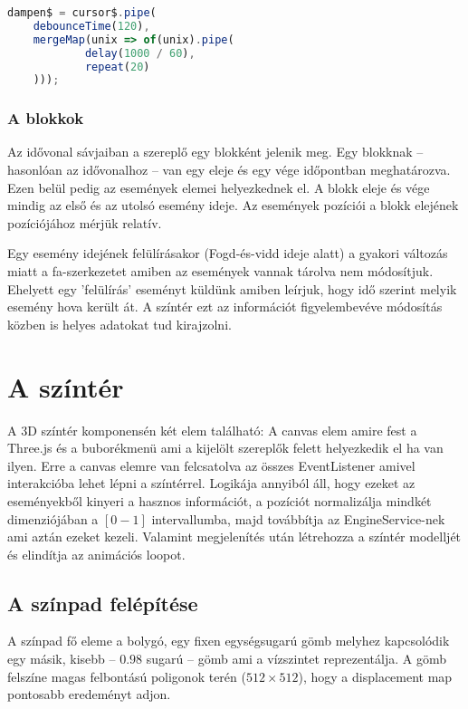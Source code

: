 \begin{lstlisting}[language={JavaScript}]
dampen$ = cursor$.pipe(
	debounceTime(120),
	mergeMap(unix => of(unix).pipe(
			delay(1000 / 60),
			repeat(20)
	)));
\end{lstlisting}

\subsubsection{A blokkok}

Az idővonal sávjaiban a szereplő egy blokként jelenik meg. Egy blokknak -- hasonlóan az idővonalhoz -- van egy eleje és egy vége időpontban meghatározva. Ezen belül pedig az események elemei helyezkednek el. A blokk eleje és vége mindig az első és az utolsó esemény ideje. Az események pozíciói a blokk elejének pozíciójához mérjük relatív.

Egy esemény idejének felülírásakor (Fogd-és-vidd ideje alatt) a gyakori változás miatt a fa-szerkezetet amiben az események vannak tárolva nem módosítjuk. Ehelyett egy 'felülírás' eseményt küldünk amiben leírjuk, hogy idő szerint melyik esemény hova került át. A színtér ezt az információt figyelembevéve módosítás közben is helyes adatokat tud kirajzolni.

\section{A színtér}

A 3D színtér komponensén két elem található: A canvas elem amire fest a Three.js és a buborékmenü ami a kijelölt szereplők felett helyezkedik el ha van ilyen. Erre a canvas elemre van felcsatolva az összes EventListener amivel interakcióba lehet lépni a színtérrel. Logikája annyiból áll, hogy ezeket az eseményekből kinyeri a hasznos információt, a pozíciót normalizálja mindkét dimenziójában a $[0-1]$ intervallumba, majd továbbítja az EngineService-nek ami aztán ezeket kezeli. Valamint megjelenítés után létrehozza a színtér modelljét és elindítja az animációs loopot.

\subsection{A színpad felépítése}

A színpad fő eleme a bolygó, egy fixen egységsugarú gömb melyhez kapcsolódik egy másik, kisebb -- $0.98$ sugarú -- gömb ami a vízszintet reprezentálja. A gömb felszíne magas felbontású poligonok terén ($512×512$), hogy a displacement map \cite{Displacement} pontosabb eredeményt adjon.

